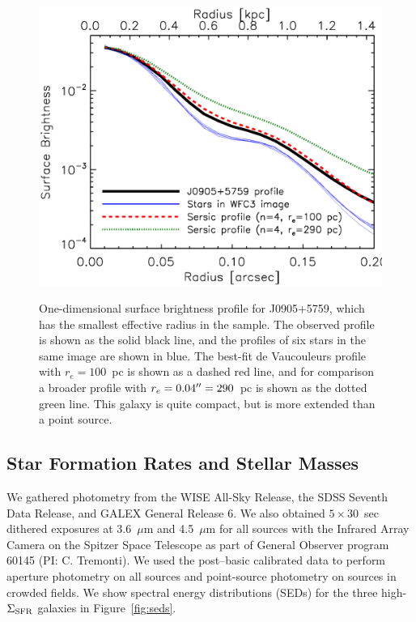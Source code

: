 \documentclass[apj]{emulateapj}
\newcommand{\sigmasfr}{\Sigma_{\textnormal{\scriptsize{SFR}}}}
\begin{document}
\begin{figure}[!t]
\includegraphics[angle=0,scale=0.41]{profile.ps}
\label{fig:profile}
\caption{One-dimensional surface brightness profile for J0905+5759,
  which has the smallest effective radius in the sample.  The observed
  profile is shown as the solid black line, and the profiles of six
  stars in the same image are shown in blue.  The best-fit de
  Vaucouleurs profile with $r_e=100$~pc is shown as a dashed red line,
  and for comparison a broader profile with $r_e=0.04\mbox{$^{\prime\prime}$}=290$~pc
  is shown as the dotted green line.  This galaxy is quite compact,
  but is more extended than a point source.}
\end{figure}

\subsection{Star Formation Rates and Stellar Masses}

We gathered photometry from the WISE All-Sky Release, the SDSS Seventh
Data Release, and GALEX General Release 6.  We also obtained
$5\times30$~sec dithered exposures at 3.6~$\mu$m and 4.5~$\mu$m for
all sources with the Infrared Array Camera on the Spitzer Space
Telescope as part of General Observer program 60145 (PI: C. Tremonti).
We used the post--basic calibrated data to perform aperture photometry
on all sources and point-source photometry on sources in crowded
fields.  We show spectral energy distributions (SEDs) for the three
high-$\sigmasfr$ galaxies in Figure~\ref{fig:seds}.
\end{document}
